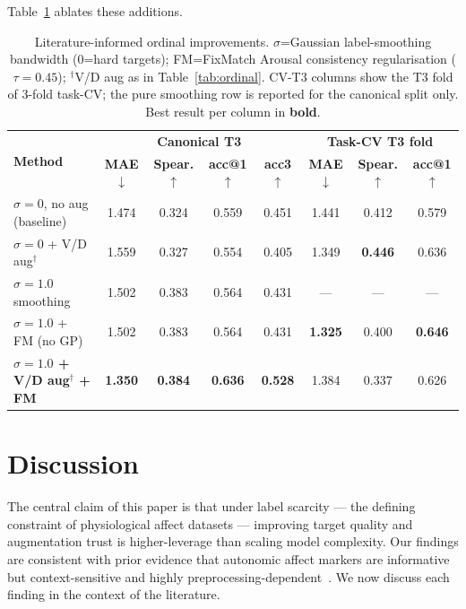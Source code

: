 \documentclass[sigconf,review,anonymous]{acmart}
\begin{document}
Table~\ref{tab:ordinal_improved} ablates these additions.

\begin{table}[t]
\caption{Literature-informed ordinal improvements.
$\sigma$=Gaussian label-smoothing bandwidth (0=hard targets);
FM=FixMatch Arousal consistency regularisation ($\tau{=}0.45$);
$^\dagger$V/D aug as in Table~\ref{tab:ordinal}.
CV-T3 columns show the T3 fold of 3-fold task-CV; the pure smoothing row is
reported for the canonical split only.
Best result per column in \textbf{bold}.}
\label{tab:ordinal_improved}
\centering
\setlength{\tabcolsep}{3pt}
\scriptsize
\begin{tabular}{lcccc|ccc}
\toprule
\multirow{2}{*}{\textbf{Method}} &
\multicolumn{4}{c|}{\textbf{Canonical T3}} &
\multicolumn{3}{c}{\textbf{Task-CV T3 fold}} \\
& \textbf{MAE}$\downarrow$ & \textbf{Spear.}$\uparrow$ &
  \textbf{acc@1}$\uparrow$ & \textbf{acc3}$\uparrow$ &
  \textbf{MAE}$\downarrow$ & \textbf{Spear.}$\uparrow$ &
  \textbf{acc@1}$\uparrow$ \\
\midrule
$\sigma{=}0$, no aug (baseline)          & 1.474 & 0.324 & 0.559 & 0.451 & 1.441 & 0.412 & 0.579 \\
$\sigma{=}0$ + V/D aug$^\dagger$         & 1.559 & 0.327 & 0.554 & 0.405 & 1.349 & \textbf{0.446} & 0.636 \\
$\sigma{=}1.0$ smoothing                 & 1.502 & 0.383 & 0.564 & 0.431 & --- & --- & --- \\
$\sigma{=}1.0$ + FM (no GP)             & 1.502 & 0.383 & 0.564 & 0.431 & \textbf{1.325} & 0.400 & \textbf{0.646} \\
\textbf{$\sigma{=}1.0$ + V/D aug$^\dagger$ + FM} &
  \textbf{1.350} & \textbf{0.384} & \textbf{0.636} & \textbf{0.528} &
  1.384 & 0.337 & 0.626 \\
\bottomrule
\end{tabular}
\end{table}

\section{Discussion}
\label{sec:discussion}

The central claim of this paper is that under label scarcity ---
the defining constraint of physiological affect datasets --- improving
target quality and augmentation trust is higher-leverage than scaling
model complexity.
Our findings are consistent with prior evidence that autonomic affect
markers are informative but context-sensitive and highly
preprocessing-dependent~\cite{kreibig2010autonomic,shu2018review,ahmad2022survey}.
We now discuss each finding in the context of the literature.
\end{document}
